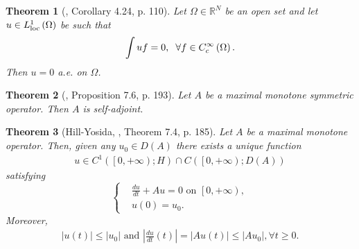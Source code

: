 \documentclass[11pt,a4paper]{article}
\numberwithin{equation}{section}
\numberwithin{equation}{section}
\newtheorem{theorem}{Theorem}[section]
\begin{document}
\begin{theorem}[\cite{Haim}, Corollary 4.24, p. 110]
Let $\Omega\in \mathbb{R}^N$ be an open set and let $u\in L_{\rm{loc}}^1\left(\Omega\right)$ be such that
\begin{align}
\int {uf}  = 0, \hspace{0.2cm} \forall f \in C_c^\infty \left( \Omega  \right).
\end{align}
Then $u=0$ a.e. on $\Omega$.
\end{theorem}

\begin{theorem}[\cite{Haim}, Proposition 7.6, p. 193]
Let $A$ be a maximal monotone symmetric operator. Then $A$ is self-adjoint.
\end{theorem}

\begin{theorem}[Hill-Yosida, \cite{Haim}, Theorem 7.4, p. 185] 
Let $A$ be a maximal monotone operator. Then, given any $u_0\in D\left(A\right)$ there exists a unique function
\begin{align}
u \in {C^1}\left( {\left[ {0, + \infty } \right);H} \right) \cap C\left( {\left[ {0, + \infty } \right);D\left( A \right)} \right)
\end{align}
satisfying
\begin{equation}
\left\{ \begin{split}
& \frac{{du}}{{dt}} + Au = 0 \mbox{ on } \left[ {0, + \infty } \right),\\
& u\left( 0 \right) = {u_0}.
\end{split} \right.
\end{equation}
Moreover, 
\begin{align}
\left| {u\left( t \right)} \right| \le \left| {{u_0}} \right| \mbox{ and } \left| {\frac{{du}}{{dt}}\left( t \right)} \right| = \left| {Au\left( t \right)} \right| \le \left| {A{u_0}} \right|,\forall t \ge 0.
\end{align}
\end{theorem}
\end{document}

